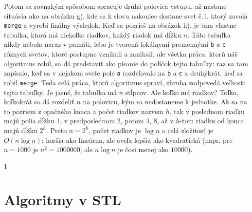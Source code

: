 \documentclass[10pt]{article}
\def\ods{\vspace*{10pt}}
\def\sectxxiii{1} %
\def\sectxxiii{0} %
\begin{document}
{}

\ods
Potom sa rovnakým spôsobom spracuje druhá polovica vstupu, až nastane situácia
ako na obrázku g), kde sa k slovu nakoniec dostane svet č.1, ktorý zavolá {\tt merge}
a vyrobí finálny výsledok. Keď sa pozrieš na obrázok h), je tam vlastne tabuľka,
ktorá má niekoľko riadkov, každý riadok má dĺžku $n$. Táto tabuľka nikdy nebola 
naraz v pamäti, lebo je tvorená lokálnymi premennými {\tt b} a {\tt c}
rôznych svetov, ktoré postupne vznikali a zanikali, 
ale všetka práca, ktorú náš algoritmus robil, sa dá predstaviť 
ako písanie do políčok tejto tabuľky: raz sa tam zapísalo, keď sa v nejakom svete
pole {\tt a} rozdeľovalo na {\tt b} a {\tt c} a druhýkrát, keď sa robil {\tt merge}.
Teda celá práca, ktorú algoritmus spraví, zhruba zodpovedá veľkosti tejto
tabuľky. Je jasné, že tabuľka má $n$ stĺpcov. Ale koľko má riadkov? Toľko, koľkokrát
sa dá rozdeliť $n$ na polovicu, kým sa nedostaneme k jednotke. Ak sa na to pozriem
z opačného konca a počet riadkov nazvem $h$, tak v poslednom riadku majú polia
dĺžku 1, v predposlednom 2, potom 4, 8, až v $h$-tom riadku od konca majú dĺžku $2^h$.
Preto $n=2^h$,
počet riadkov je $\log n$ a celá zložitosť je $O(n\log n)$: horšia ako lineárna,
ale oveľa lepšia ako kvadratická (napr. pre $n=1000$ je $n^2=1000000$, ale $n\log n$
je čosi menej ako $10000$).

\fi

\if\sectxxiii1
\section{Algoritmy v STL}
\end{document}
